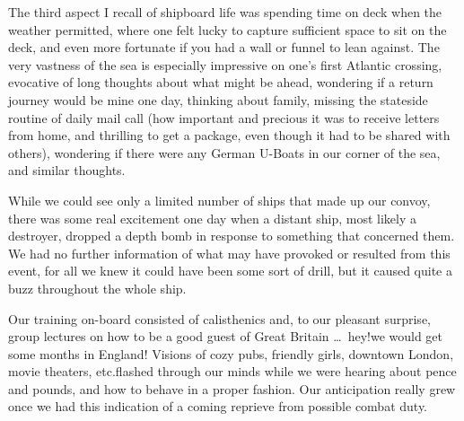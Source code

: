 \documentclass[../m3y]{subfiles}
\begin{document}
The third aspect I recall of shipboard life was spending time on deck when the weather permitted, where one felt lucky to capture sufficient space to sit on the deck, and even more fortunate if you had a wall or funnel to lean against. The very vastness of the sea is especially impressive on one's first Atlantic crossing, evocative of long thoughts about what might be ahead, wondering if a return journey would be mine one day, thinking about family, missing the stateside routine of daily mail call (how important and precious it was to receive letters from home, and thrilling to get a package, even though it had to be shared with others), wondering if there were any German U-Boats in our corner of the sea, and similar thoughts.

While we could see only a limited number of ships that made up our convoy, there was some real excitement one day when a distant ship, most likely a destroyer, dropped a depth bomb in response to something that concerned them. We had no further information of what may have provoked or resulted from this event, for all we knew it could have been some sort of drill, but it caused quite a buzz throughout the whole ship.

Our training on-board consisted of calisthenics and, to our pleasant surprise, group lectures on how to be a good guest of Great Britain \ldots\ hey!\@ we would get some months in England! Visions of cozy pubs, friendly girls, downtown London, movie theaters, etc.\@ flashed through our minds while we were hearing about pence and pounds, and how to behave in a proper fashion. Our anticipation really grew once we had this indication of a coming reprieve from possible combat duty.
\end{document}
